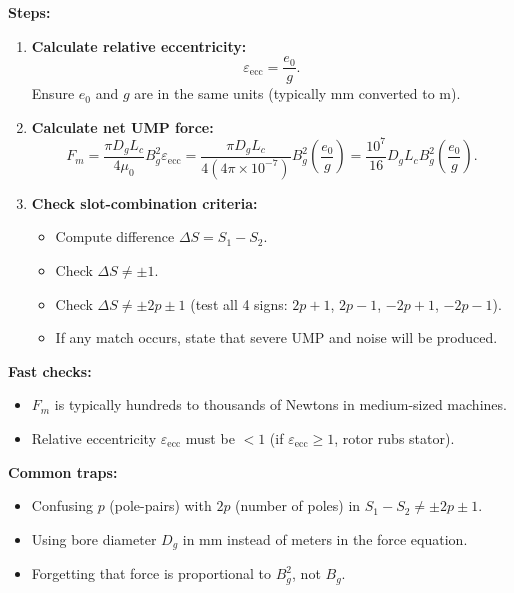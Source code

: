 \textbf{Steps:}
\begin{enumerate}
  \item \textbf{Calculate relative eccentricity:}
  \[
  \varepsilon_{\mathrm{ecc}} = \frac{e_0}{g}.
  \]
  Ensure $e_0$ and $g$ are in the same units (typically mm converted to m).
  \item \textbf{Calculate net UMP force:}
  \[
  F_m = \frac{\pi D_g L_c}{4\mu_0} B_g^2 \varepsilon_{\mathrm{ecc}} = \frac{\pi D_g L_c}{4(4\pi\times 10^{-7})} B_g^2 \left(\frac{e_0}{g}\right) = \frac{10^7}{16} D_g L_c B_g^2 \left(\frac{e_0}{g}\right).
  \]
  \item \textbf{Check slot-combination criteria:}
  \begin{itemize}
    \item Compute difference $\Delta S = S_1 - S_2$.
    \item Check $\Delta S \neq \pm 1$.
    \item Check $\Delta S \neq \pm 2p \pm 1$ (test all 4 signs: $2p+1$, $2p-1$, $-2p+1$, $-2p-1$).
    \item If any match occurs, state that severe UMP and noise will be produced.
  \end{itemize}
\end{enumerate}

\textbf{Fast checks:}
\begin{itemize}
  \item $F_m$ is typically hundreds to thousands of Newtons in medium-sized machines.
  \item Relative eccentricity $\varepsilon_{\mathrm{ecc}}$ must be $< 1$ (if $\varepsilon_{\mathrm{ecc}} \ge 1$, rotor rubs stator).
\end{itemize}

\textbf{Common traps:}
\begin{itemize}
  \item Confusing $p$ (pole-pairs) with $2p$ (number of poles) in $S_1 - S_2 \neq \pm 2p \pm 1$.
  \item Using bore diameter $D_g$ in mm instead of meters in the force equation.
  \item Forgetting that force is proportional to $B_g^2$, not $B_g$.
\end{itemize}
